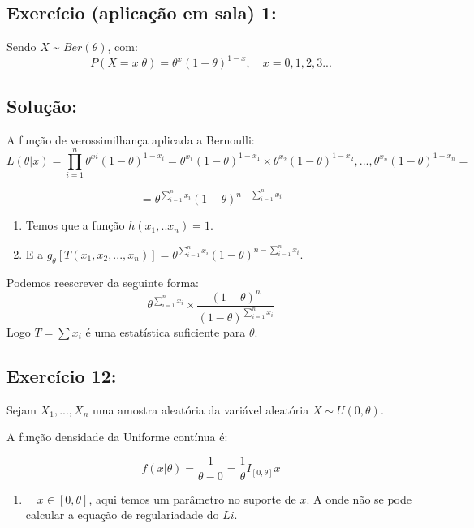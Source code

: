 \documentclass[
]{report}
\providecommand{\tightlist}{%
  \setlength{\itemsep}{0pt}\setlength{\parskip}{0pt}}\usepackage{longtable,booktabs,array}
\begin{document}
\subsection{Exercício (aplicação em sala)
1:}\label{exercuxedcio-aplicauxe7uxe3o-em-sala-1}

Sendo \(X\) \textasciitilde{} \(Ber(\theta)\), com: \[
P(X=x| \theta)=\theta^x(1-\theta)^{1-x}, \quad x = 0,1,2,3...
\]

\subsection{Solução:}\label{soluuxe7uxe3o}

A função de verossimilhança aplicada a Bernoulli: \[
L(\theta|x) = \prod_{i=1}^{n} \theta^{xi}(1-\theta)^{1-x_i} = \theta^{x_1}(1-\theta)^{1-x_1}\times\theta^{x_2}(1-\theta)^{1-x_2},...,\theta^{x_n}(1-\theta)^{1-x_n} =
\]

\[
= \theta^{\sum_{i=1}^{n}x_i}(1-\theta)^{n-\sum_{i=1}^{n}x_i}
\]

\begin{enumerate}
\def\labelenumi{\arabic{enumi}.}
\tightlist
\item
  Temos que a função \(h(x_1,..x_n) = 1\).
\item
  E a
  \(g_\theta[T(x_1,x_2,...,x_n)]= \theta^{\sum_{i=1}^{n}x_i}(1-\theta)^{n-\sum_{i=1}^{n}x_i}\).
\end{enumerate}

Podemos reescrever da seguinte forma: \[
\theta^{\sum_{i=1}^{n}x_i} \times \frac{(1-\theta)^{n}}{(1-\theta)^{\sum_{i=1}^{n}x_i}}
\] Logo \(T=\sum{x_i}\) é uma estatística suficiente para \(\theta\).

\subsection{Exercício 12:}\label{exercuxedcio-12}

Sejam \(X_1,...,X_n\) uma amostra aleatória da variável aleatória
\(X ∼ U(0, θ)\).

A função densidade da Uniforme contínua é:

\[
f(x|\theta)= \frac{1}{\theta-0}=\frac{1}{\theta}I_{[0,\theta]}x
\]

\begin{enumerate}
\def\labelenumi{\arabic{enumi}.}
\tightlist
\item
  \(\quad x \in [0,\theta]\), aqui temos um parâmetro no suporte de
  \(x\). A onde não se pode calcular a equação de regulariadade do
  \(Li\).
\end{enumerate}
\end{document}
